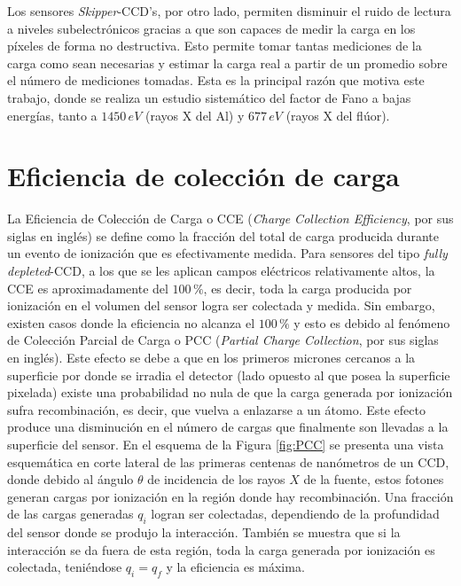 Los sensores \textit{Skipper}-CCD's, por otro lado, permiten disminuir el ruido de lectura a niveles subelectrónicos gracias a que son capaces de medir la carga en los píxeles de forma no destructiva. Esto permite tomar tantas mediciones de la carga como sean necesarias y estimar la carga real a partir de un promedio sobre el número de mediciones tomadas. 
Esta es la principal razón que motiva este trabajo, donde se realiza un estudio sistemático del factor de Fano a bajas energías, tanto a $1450\,\si{eV}$ (rayos X del Al) y $677\,\si{eV}$ (rayos X del flúor).

\section{Eficiencia de colección de carga}
\noindent La Eficiencia de Colección de Carga o CCE (\textit{Charge Collection Efficiency}, por sus siglas en inglés) se define como la fracción del total de carga producida durante un evento de ionización que es efectivamente medida. 
Para sensores del tipo \textit{fully depleted}-CCD\cite{osti_838066}, a los que se les aplican campos eléctricos relativamente altos, la CCE es aproximadamente del $100\,\%$, es decir, toda la carga producida por ionización en el volumen del sensor logra ser colectada y medida. 
Sin embargo, existen casos donde la eficiencia no alcanza el $100\,\%$ y esto es debido al fenómeno de Colección Parcial de Carga o PCC (\textit{Partial Charge Collection}, por sus siglas en inglés)\cite{PCC-CCE}. 
Este efecto se debe a que en los primeros micrones cercanos a la superficie por donde se irradia el detector (lado opuesto al que posea la superficie pixelada) existe una probabilidad no nula de que la carga generada por ionización sufra recombinación, es decir, que vuelva a enlazarse a un átomo. Este efecto produce una disminución en el número de cargas que finalmente son llevadas a la superficie del sensor. 
En el esquema de la Figura \ref{fig:PCC} se presenta una vista esquemática en corte lateral de las primeras centenas de nanómetros de un CCD, donde debido al ángulo $\theta$ de incidencia de los rayos $X$ de la fuente, estos fotones generan cargas por ionización en la región donde hay recombinación. Una fracción de las cargas generadas $q_{i}$ logran ser colectadas, dependiendo de la profundidad del sensor donde se produjo la interacción. También se muestra que si la interacción se da fuera de esta región, toda la carga generada por ionización es colectada, teniéndose $q_{i} = q_{f}$ y la eficiencia es máxima.
